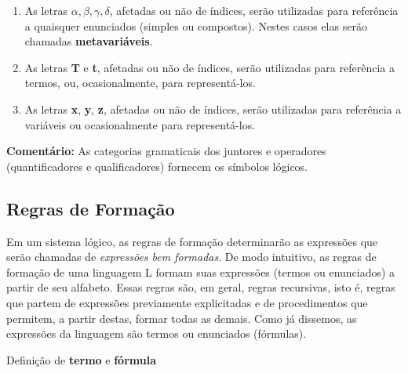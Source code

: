 \begin{enumerate}[label=\arabic*)]
\begin{enumerate}[label=\roman*)]
        \item As letras $\alpha, \beta, \gamma, \delta$, afetadas ou não de índices, serão utilizadas para referência a quaisquer enunciados (simples ou compostos).
        Nestes casos elas serão chamadas \textbf{metavariáveis}.

        \item As letras \textbf{T} e \textbf{t}, afetadas ou não de índices, serão utilizadas para referência a termos, ou, ocasionalmente, para representá-los.

        \item As letras \textbf{x}, \textbf{y}, \textbf{z}, afetadas ou não de índices, serão utilizadas para referência a variáveis ou ocasionalmente para representá-los.
    \end{enumerate}

    \noindent \textbf{Comentário:} As categorias gramaticais dos juntores e operadores (quantificadores e qualificadores) fornecem os símbolos lógicos.
\end{enumerate}

\subsection{Regras de Formação}
\setcounter{exemplo}{0}

Em um sistema lógico, as regras de formação determinarão as expressões que serão chamadas de \emph{expressões bem formadas}.
De modo intuitivo, as regras de formação de uma linguagem L formam suas expressões (termos ou enunciados) a partir de seu alfabeto.
Essas regras são, em geral, regras recursivas, isto é, regras que partem de expressões previamente explicitadas e de procedimentos que permitem, a partir destas, formar todas as demais.
Como já dissemos, as expressões da linguagem são termos ou enunciados (fórmulas).

\bigskip
\noindent Definição de \textbf{termo} e \textbf{fórmula}

